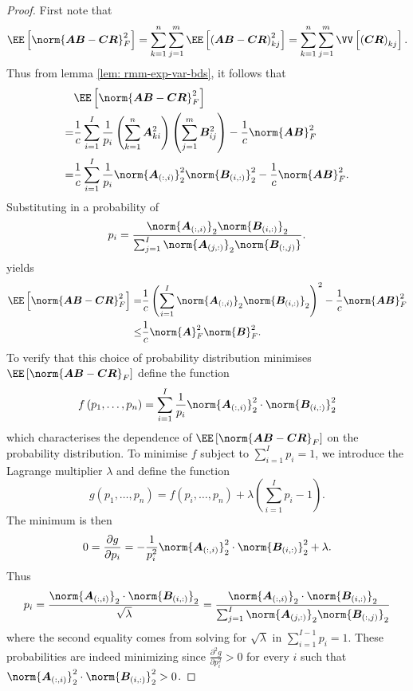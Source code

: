\begin{proof}
    First note that
    \[
        \EE \left[ \norm{\bm{A} \bm{B} - \bm{C} \bm{R}}_{F}^{2} \right]
        = \sum_{k=1}^{n} \sum_{j=1}^{m} \EE \left[ \left( \bm{A} \bm{B} - \bm{C} \bm{R}\right)_{kj}^{2} \right]
        = \sum_{k=1}^{n} \sum_{j=1}^{m} \VV \left[ \left( \bm{C} \bm{R} \right)_{kj} \right].
    \]
    Thus from lemma \ref{lem: rmm-exp-var-bds}, it follows that
    \begin{align*}
          & \EE \left[ \norm{\bm{A} \bm{B} - \bm{C} \bm{R}}^2_F \right]                                                                                                                     \\
        = & \frac{1}{c} \sum_{i=1}^{I} \frac{1}{p_i} \left( \sum_{k=1}^{n} \bm{A}_{ki}^{2} \right) \left( \sum_{j=1}^{m} \bm{B}_{ij}^{2} \right) - \frac{1}{c} \norm{\bm{A} \bm{B}}_{F}^{2} \\
        = & \frac{1}{c} \sum_{i=1}^{I} \frac{1}{p_i} \norm{\bm{A}_{(:,i)}}_{2}^{2} \norm{\bm{B}_{(i,:)}}_{2}^{2} - \frac{1}{c} \norm{\bm{A} \bm{B}}_{F}^{2}.
    \end{align*}
    Substituting in a probability of
    \[
        p_i = \frac{\norm{\bm{A}_{(:,i)}}_2 \norm{\bm{B}_{(i,:)}}_2}{\sum_{j=1}^{I} \norm{\bm{A}_{(j,:)}}_2 \norm{\bm{B}_{(:,j)}}}.
    \]
    yields
    \begin{align*}
        \EE \left[ \norm{\bm{A} \bm{B} - \bm{C} \bm{R}}^2_F \right] = & \frac{1}{c} \left( \sum_{i=1}^{I} \norm{\bm{A}_{(:,i)}}_{2} \norm{\bm{B}_{(i,:)}}_{2} \right)^{2} - \frac{1}{c} \norm{\bm{A} \bm{B}}_{F}^{2} \\
        \leq                                                          & \frac{1}{c} \norm{\bm{A}}^2_{F} \norm{\bm{B}}^2_{F}.
    \end{align*}
    To verify that this choice of probability distribution minimises $\EE \left[ \norm{\bm{A} \bm{B} - \bm{C} \bm{R}}_{F} \right]$ define the function
    \[
        f \left( p_1 , \ldots , p_n \right) = \sum_{i=1}^{I} \frac{1}{p_i} \norm{\bm{A}_{(:,i)}}_{2}^{2} \cdot \norm{\bm{B}_{(i,:)}}_{2}^{2}
    \]
    which characterises the dependence of $\EE \left[ \norm{\bm{A} \bm{B} - \bm{C} \bm{R}}_{F} \right]$ on the probability distribution. To minimise $f$ subject to $\sum_{i=1}^{I} p_i = 1$, we introduce the Lagrange multiplier $\lambda$ and define the function
    \[
        g \left( p_1 , \ldots , p_n \right) = f \left( p_i , \ldots , p_n \right) + \lambda \left( \sum_{i=1}^{I} p_i - 1 \right).
    \]
    The minimum is then
    \[
        0 = \frac{\partial g}{\partial p_i} = - \frac{1}{p_i^2} \norm{\bm{A}_{(:,i)}}_{2}^{2} \cdot \norm{\bm{B}_{(i,:)}}_{2}^{2} + \lambda.
    \]
    Thus
    \[
        p_i = \frac{\norm{\bm{A}_{(:,i)}}_{2} \cdot \norm{\bm{B}_{(i,:)}}_{2}}{\sqrt{\lambda}} = \frac{\norm{\bm{A}_{(:,i)}}_{2} \cdot \norm{\bm{B}_{(i,:)}}_{2}}{\sum_{j=1}^{I} \norm{\bm{A}_{(j,:)}}_{2} \norm{\bm{B}_{(:,j)}}_{2}}
    \]
    where the second equality comes from solving for $\sqrt{\lambda}$ in $\sum_{i=1}^{I-1} p_i = 1$. These probabilities are indeed minimizing since $\frac{\partial^2 g}{\partial p_i^2} > 0$ for every $i$ such that $\norm{\bm{A}_{(:,i)}}_{2}^{2} \cdot \norm{\bm{B}_{(i,:)}}_{2}^{2} > 0$.
\end{proof}
